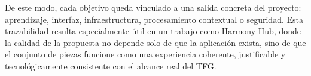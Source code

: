 De este modo, cada objetivo queda vinculado a una salida concreta del proyecto:
aprendizaje, interfaz, infraestructura, procesamiento contextual o seguridad.
Esta trazabilidad resulta especialmente útil en un trabajo como Harmony Hub,
donde la calidad de la propuesta no depende solo de que la aplicación exista,
sino de que el conjunto de piezas funcione como una experiencia coherente,
justificable y tecnológicamente consistente con el alcance real del TFG.
